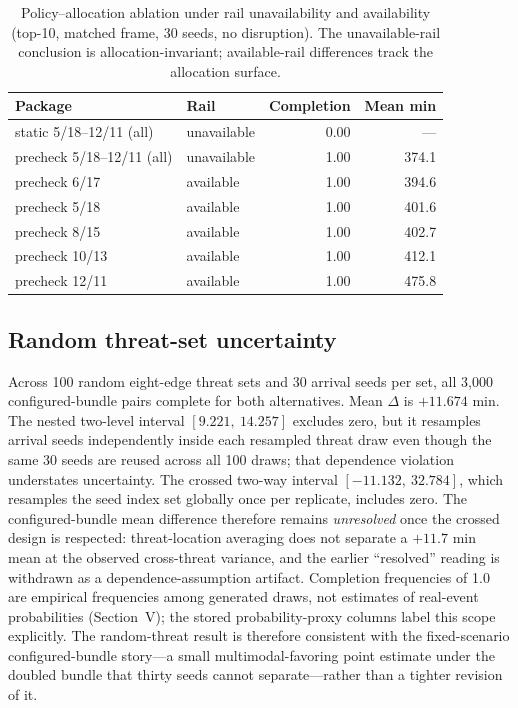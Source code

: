 \documentclass{ieeeaccess}
\begin{document}
\begin{table}[!t]
\caption{Policy--allocation ablation under rail unavailability and availability (top-10, matched frame, 30 seeds, no disruption). The unavailable-rail conclusion is allocation-invariant; available-rail differences track the allocation surface.}
\label{tab:ablation}
\centering
\footnotesize
\begin{tabular}{@{}llrr@{}}
\hline
Package & Rail & Completion & Mean min \\
\hline
static 5/18--12/11 (all) & unavailable & 0.00 & --- \\
precheck 5/18--12/11 (all) & unavailable & 1.00 & 374.1 \\
precheck 6/17 & available & 1.00 & 394.6 \\
precheck 5/18 & available & 1.00 & 401.6 \\
precheck 8/15 & available & 1.00 & 402.7 \\
precheck 10/13 & available & 1.00 & 412.1 \\
precheck 12/11 & available & 1.00 & 475.8 \\
\hline
\end{tabular}
\end{table}

\subsection{Random threat-set uncertainty}
Across 100 random eight-edge threat sets and 30 arrival seeds per set, all 3{,}000 configured-bundle pairs complete for both alternatives. Mean $\Delta$ is $+11.674$ min. The nested two-level interval $[9.221,\ 14.257]$ excludes zero, but it resamples arrival seeds independently inside each resampled threat draw even though the same 30 seeds are reused across all 100 draws; that dependence violation understates uncertainty. The crossed two-way interval $[-11.132,\ 32.784]$, which resamples the seed index set globally once per replicate, includes zero. The configured-bundle mean difference therefore remains \emph{unresolved} once the crossed design is respected: threat-location averaging does not separate a $+11.7$ min mean at the observed cross-threat variance, and the earlier ``resolved'' reading is withdrawn as a dependence-assumption artifact. Completion frequencies of 1.0 are empirical frequencies among generated draws, not estimates of real-event probabilities (Section~V); the stored probability-proxy columns label this scope explicitly. The random-threat result is therefore consistent with the fixed-scenario configured-bundle story---a small multimodal-favoring point estimate under the doubled bundle that thirty seeds cannot separate---rather than a tighter revision of it.
\end{document}
